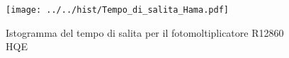 \begin{figure}[h] \centering \texttt{[image: ../../hist/Tempo\_di\_salita\_Hama.pdf]}\caption{Istogramma del tempo di salita per il fotomoltiplicatore R12860 HQE}\label{hist:Tempo_di_salita_Hama} \end{figure}
